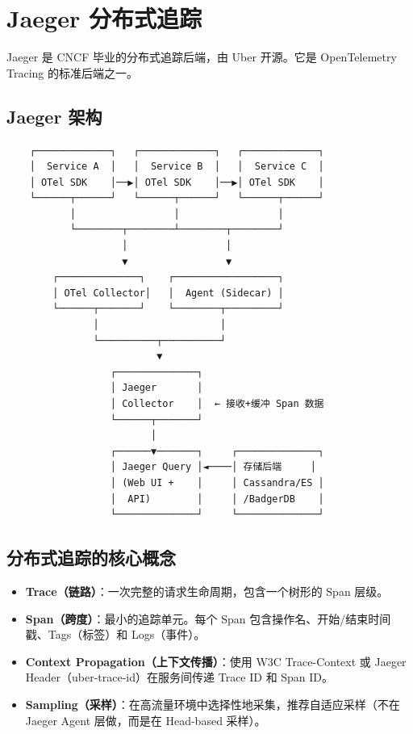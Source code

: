 \documentclass[12pt,UTF8]{ctexbook}
\begin{document}
\section{Jaeger 分布式追踪}
\label{sec:jaeger}

Jaeger 是 CNCF 毕业的分布式追踪后端，由 Uber 开源。它是 OpenTelemetry Tracing 的标准后端之一。

\subsection*{Jaeger 架构}

\begin{lstlisting}
    ┌─────────────┐   ┌─────────────┐   ┌─────────────┐
    │  Service A  │   │  Service B  │   │  Service C  │
    │ OTel SDK    │──▶│ OTel SDK    │──▶│ OTel SDK    │
    └──────┬──────┘   └──────┬──────┘   └──────┬──────┘
           │                 │                 │
           └────────┬────────┴────────┬────────┘
                    │                 │
                    ▼                 ▼
        ┌──────────────┐    ┌──────────────────┐
        │ OTel Collector│   │  Agent (Sidecar) │
        └──────┬───────┘    └────────┬─────────┘
               │                     │
               └──────────┬──────────┘
                          ▼
                  ┌──────────────┐
                  │ Jaeger       │
                  │ Collector    │  ← 接收+缓冲 Span 数据
                  └──────┬───────┘
                         │
                  ┌──────▼───────┐     ┌──────────────┐
                  │ Jaeger Query │◄────│ 存储后端     │
                  │ (Web UI +    │     │ Cassandra/ES │
                  │  API)        │     │ /BadgerDB    │
                  └──────────────┘     └──────────────┘
\end{lstlisting}

\subsection*{分布式追踪的核心概念}

\begin{itemize}
    \item \textbf{Trace（链路）}：一次完整的请求生命周期，包含一个树形的 Span 层级。
    \item \textbf{Span（跨度）}：最小的追踪单元。每个 Span 包含操作名、开始/结束时间戳、Tags（标签）和 Logs（事件）。
    \item \textbf{Context Propagation（上下文传播）}：使用 W3C Trace-Context 或 Jaeger Header（uber-trace-id）在服务间传递 Trace ID 和 Span ID。
    \item \textbf{Sampling（采样）}：在高流量环境中选择性地采集，推荐自适应采样（不在 Jaeger Agent 层做，而是在 Head-based 采样）。
\end{itemize}
\end{document}
